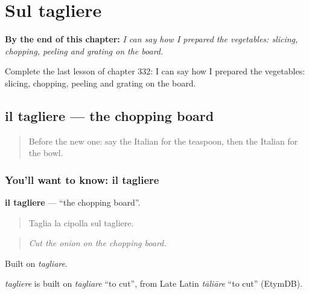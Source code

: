 
\chapter{Sul tagliere}
\label{ch:it-sul-tagliere}

\begin{chapteropening}
\textbf{By the end of this chapter:} \emph{I can say how I prepared the vegetables: slicing, chopping, peeling and grating on the board.}

Complete the last lesson of chapter 332: I can say how I prepared the vegetables: slicing, chopping, peeling and grating on the board.
\end{chapteropening}

\section[il tagliere]{il tagliere — the chopping board}

\label{lesson:IT-C332-tagliere}



\begin{quote}
Before the new one: say the Italian for the teaspoon, then the Italian for the bowl.
\end{quote}

\subsection*{You'll want to know: il tagliere}
\textbf{il tagliere} — \textquotedblleft{}the chopping board\textquotedblright{}.

\begin{quote}
Taglia la cipolla sul tagliere.
\end{quote}

\begin{quote}
\emph{Cut the onion on the chopping board.}
\end{quote}

Built on \emph{tagliare}.

\begin{cousinweb}
\emph{tagliere} is built on \emph{tagliare} \textquotedblleft{}to cut\textquotedblright{}, from Late Latin \emph{tāliāre} \textquotedblleft{}to cut\textquotedblright{} (EtymDB).
\end{cousinweb}


